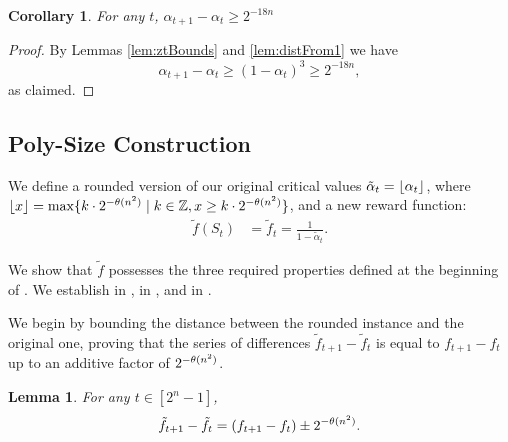 \documentclass[11pt]{article}
\newtheorem{lemma}{Lemma}
\newtheorem{corollary}{Corollary}
\newcommand{\tf}{\tilde{f}}
\newcommand{\talpha}{\tilde{\alpha}}
\begin{document}
\begin{corollary}\label{cor:alphaDiffBound}
    For any $t$, $\alpha_{t+1} - \alpha_t \ge 2^{-18n}$
\end{corollary}
\begin{proof}
    By Lemmas \ref{lem:ztBounds} and \ref{lem:distFrom1} we have
    $$
    \alpha_{t+1} - \alpha_t \ge (1-\alpha_t)^3 \ge 2^{-18n},
    $$
    as claimed.
\end{proof}

\subsection{Poly-Size Construction}\label{subApx:construction}
We define a rounded version of our original critical values $\talpha_t = \floor{\alpha_t}$, where $\lfloor x\rfloor = \max\{k\cdot 2^{-\theta(n^2)} \mid k \in \mathbb{Z}, x \ge k\cdot 2^{-\theta(n^2)} \}$, 
and a new reward function:
\begin{align}\label{eq:roundingscheme}
\tf(S_t) &= \tf_t = \frac{1}{1-\talpha_t}.
\end{align}

We show that $\tf$ possesses the three required properties defined at the beginning of . 
We establish  in ,  in ,
and  in . 

We begin by bounding the distance between the rounded instance and the original one, proving that the series of differences $\tf_{t+1} - \tf_t$ is equal to 
$f_{t+1} - f_t$  up to an additive factor of $2^{-\theta(n^2)}$.
\begin{lemma}\label{lem:ftlProximity}
For any $t \in [2^n-1]$,
$$
\tf_{t+1} - \tf_t = (f_{t+1} - f_t) \pm 2^{-\tn}.
$$
\end{lemma}
\end{document}
